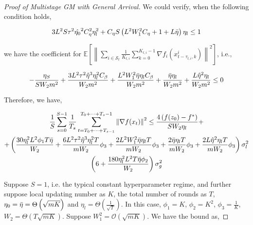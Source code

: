 \begin{proof}[Proof of Multistage GM with General Arrival]
We could verify, when the following condition holds,

\begin{equation}
\begin{gathered}
3L^2 S \tau^2 \hat{\eta_0}^2 C_\eta^2 \eta_l^2 + C_\eta S \left( L^2 W_1^2 C_\eta + 1 + L \Bar{\eta} \right)  \eta_l \leq 1
\end{gathered}\nonumber
\end{equation}

we have the coefficient for $\mathbb{E}\left[\left\| \sum_{i\in\mathcal{S}_t} \frac{1}{K_{t,i}} \sum_{k=0}^{K_{t,i}-1} \nabla f_i(x_{t-\tau_{t,i},k}^i) \right\|^2\right]$, i.e.,

\begin{equation}
\begin{gathered}
 -\frac{\eta_S}{S W_2 m^2} + \frac{3 L^2 \tau^2 \hat{\eta}^3 \eta_l^2 C_\beta}{W_2 m^2} + \frac{L^2 W_1^2 \Bar{\eta} \eta_l C_\beta}{W_2 m^2} + \frac{\Bar{\eta}\eta_l}{W_2 m^2} + \frac{L\hat{\eta}^2\eta_l}{W_2 m^2} \leq 0
\end{gathered}\nonumber
\end{equation}

Therefore, we have,

\begin{equation}
\begin{gathered}
 \frac{1}{S}\sum_{s=0}^{S-1} \frac{1}{T_s}\sum_{t=T_0+\dots+T_{s-1} }^{T_0+\dots+T_s-1} \left\|\nabla f(x_t)\right\|^2
\leq \frac{4 \left(f(z_0) - f^\ast  \right)}{S W_2 \eta_l} +\\
+\left( \frac{30  \eta^2_l L^2 \phi_1 T \Bar{\eta}}{W_2}  + \frac{6 L^2 \tau^2 \hat{\eta}^3 \eta_l^2 T}{m W_2} \phi_3 + \frac{ 2 L^2 W_1^2 \Bar{\eta}\eta_l T}{m W_2} \phi_3 + \frac{2 \Bar{\eta}\eta_l T}{m W_2} \phi_3 + \frac{2 L \hat{\eta}^2 \eta_l T}{m W_2} \phi_3 \right)\sigma_l^2\\
\left(6 + \frac{180 \eta^2_l L^2 T \Bar{\eta}\phi_2 }{W_2}\right)\sigma_g^2
\end{gathered}\nonumber
\end{equation}




Suppose $S=1$, i.e. the typical constant hyperparameter regime, and further suppose local updating number as $K$, the total number of rounds as $T$, $\eta_0=\Bar{\eta}=\Theta\left(\sqrt{mK}\right)$ and $\eta_l=\Theta\left(\frac{1}{\sqrt{T}}\right)$. In this case, $\phi_1=K$, $\phi_2=K^2$, $\phi_3=\frac{1}{K}$, $W_2=\Theta\left(T\sqrt{mK}\right)$. Suppose $W_1^2=\mathcal{O}\left(\sqrt{mK}\right)$. We have the bound as,


\end{proof}
